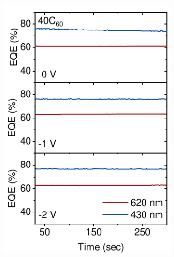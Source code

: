\begin{figure}[htbp]
\begin{subfigure}{0.32\textwidth}
        \includegraphics[width=\textwidth]{chapters/transport_layers/images/StaticEQE_40C60.pdf}
        \caption{}
        \label{}
    \end{subfigure}
    \hfill
    \begin{subfigure}{0.32\textwidth}
        \centering

\end{subfigure}
\end{figure}
